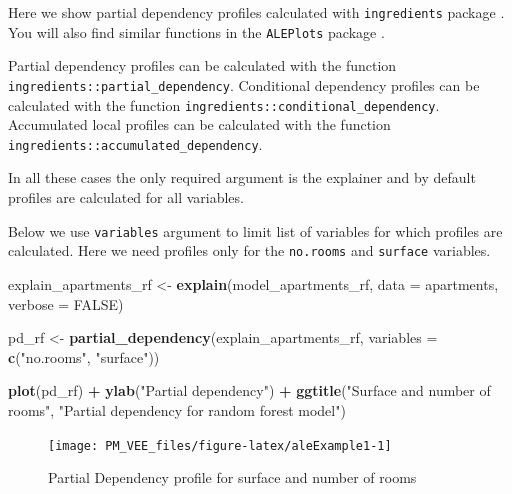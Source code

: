 \documentclass[12pt,]{krantz}
\newenvironment{Shaded}{\begin{snugshade}}{\end{snugshade}}
\newcommand{\DataTypeTok}[1]{\textcolor[rgb]{0.13,0.29,0.53}{#1}}
\newcommand{\KeywordTok}[1]{\textcolor[rgb]{0.13,0.29,0.53}{\textbf{#1}}}
\newcommand{\NormalTok}[1]{#1}
\newcommand{\OperatorTok}[1]{\textcolor[rgb]{0.81,0.36,0.00}{\textbf{#1}}}
\newcommand{\OtherTok}[1]{\textcolor[rgb]{0.56,0.35,0.01}{#1}}
\newcommand{\StringTok}[1]{\textcolor[rgb]{0.31,0.60,0.02}{#1}}
\begin{document}
Here we show partial dependency profiles calculated with \texttt{ingredients} package \citep{ingredientsRPackage}. You will also find similar functions in the \texttt{ALEPlots} package \citep{ALEPlotRPackage}.

Partial dependency profiles can be calculated with the function \texttt{ingredients::partial\_dependency}.
Conditional dependency profiles can be calculated with the function \texttt{ingredients::conditional\_dependency}.
Accumulated local profiles can be calculated with the function \texttt{ingredients::accumulated\_dependency}.

In all these cases the only required argument is the explainer and by default profiles are calculated for all variables.

Below we use \texttt{variables} argument to limit list of variables for which profiles are calculated. Here we need profiles only for the \texttt{no.rooms} and \texttt{surface} variables.

\begin{Shaded}
\begin{Highlighting}[]
\NormalTok{explain_apartments_rf <-}\StringTok{ }\KeywordTok{explain}\NormalTok{(model_apartments_rf, }
                                 \DataTypeTok{data =}\NormalTok{ apartments,}
                                 \DataTypeTok{verbose =} \OtherTok{FALSE}\NormalTok{)}

\NormalTok{pd_rf <-}\StringTok{ }\KeywordTok{partial_dependency}\NormalTok{(explain_apartments_rf, }\DataTypeTok{variables =} \KeywordTok{c}\NormalTok{(}\StringTok{"no.rooms"}\NormalTok{, }\StringTok{"surface"}\NormalTok{))}

\KeywordTok{plot}\NormalTok{(pd_rf) }\OperatorTok{+}\StringTok{ }\KeywordTok{ylab}\NormalTok{(}\StringTok{"Partial dependency"}\NormalTok{) }\OperatorTok{+}
\StringTok{  }\KeywordTok{ggtitle}\NormalTok{(}\StringTok{"Surface and number of rooms"}\NormalTok{, }\StringTok{"Partial dependency for random forest model"}\NormalTok{) }
\end{Highlighting}
\end{Shaded}

\begin{figure}

{\centering \texttt{[image: PM\_VEE\_files/figure-latex/aleExample1-1]} 

}

\caption{Partial Dependency profile for surface and number of rooms}\label{fig:aleExample1}
\end{figure}
\end{document}
